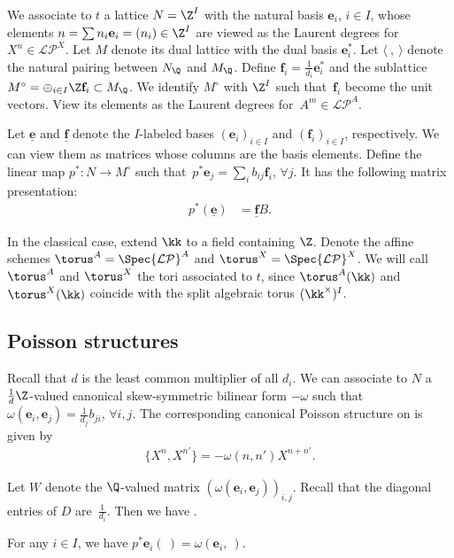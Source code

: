 \documentclass[pdftex]{sigma}
\newcommand{\Mc}{M^\circ}
\newcommand{\LP}{{\mathcal{LP}}}
\newcommand{\ee}{\mathbf{e}}
\newcommand{\ff}{\mathbf{f}}
\newcommand{\uee}{\underline{\ee}}
\newcommand{\uff}{\underline{\ff}}
\numberwithin{equation}{section}
\begin{document}
We associate to $t$ a lattice $N=\Z^{I}$ with the natural basis
$\ee_{i}$, $i\in I$, whose elements $n=\sum n_{i}\ee_{i}=(n_{i})\in\Z^{I}$
are viewed as the Laurent degrees for $X^{n}\in\LP^{X}$. Let $M$
denote its dual lattice with the dual basis $\ee_{i}^{*}$. Let $\langle\ ,\ \rangle$
denote the natural pairing between $N_{\Q}$ and $M_{\Q}$. Define
$\ff_{i}=\frac{1}{d_{i}}\ee_{i}^{*}$ and the sublattice $\Mc=\oplus_{i\in I}\Z\ff_{i}\subset M_{\Q}$.
We identify $\Mc$ with $\Z^{I}$ such that~$\ff_{i}$ become the
unit vectors. View its elements \smash{$m=\sum m_{i}\ff_{i}=(m_{i})\in\Z^{I}$}
as the Laurent degrees for~$A^{m}\in\LP^{A}$.

Let $\uee$ and $\uff$ denote the $I$-labeled bases $(\ee_{i})_{i\in I}$
and $(\ff_{i})_{i\in I}$, respectively. We can view them as matrices
whose columns are the basis elements. Define the linear map $p^{*}\colon N\rightarrow\Mc$
such that~$p^{*}\ee_{j}=\sum_{i}b_{ij}\ff_{i}$, $\forall j$. It
has the following matrix presentation:
\begin{align*}
p^{*}(\uee) & =\uff B.
\end{align*}


In the classical case, extend $\kk$ to a field containing $\Z$. Denote the affine schemes $\torus^{A}=\Spec\LP^{A}$ and $\torus^{X}=\Spec\LP^{X}$.
We will call $\torus^{A}$ and $\torus^{X}$ the tori associated to
$t$, since $\torus^{A}(\kk)$ and $\torus^{X}(\kk)$ coincide with
the split algebraic torus $(\kk^{\times})^{I}$.

\subsection{Poisson structures}

Recall that $d$ is the least common multiplier of all $d_i$. We can associate to $N$ a $\frac{1}{d}\Z$-valued canonical skew-symmetric bilinear
form $-\omega$ such that $\omega(\ee_{i},\ee_{j})=\frac{1}{d_{j}}b_{ji}$,
$\forall i,j$. The corresponding canonical Poisson structure on 
is given by
\begin{align}
\bigl\{X^{n},X^{n'}\bigr\} =-\omega(n,n')X^{n+n'}.\label{eq:log-Poisson}
\end{align}

Let $W$ denote the $\Q$-valued matrix $(\omega(\ee_{i},\ee_{j}))_{i,j}$. Recall that the diagonal entries of $D$ are~$\frac{1}{d_i}$. Then we have .


\begin{Remark}
For any $i\in I$, we have $p^{*}\ee_{i}(\ )=\omega(\ee_{i},\ )$.
\end{Remark}
\end{document}
